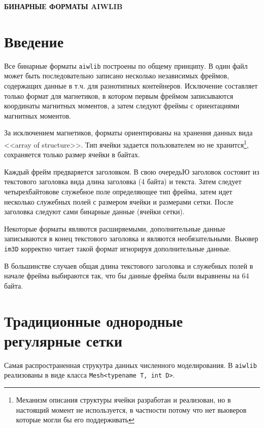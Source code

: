 \documentclass[12pt]{article}
\begin{document}
\begin{center}
  \Large\bf БИНАРНЫЕ ФОРМАТЫ AIWLIB
\end{center}
\tableofcontents

\section{Введение}
Все бинарные форматы \verb'aiwlib' построены по общему принципу. В один файл может быть последовательно записано несколько независимых фреймов,
содержащих данные в т.ч. для разнотипных контейнеров. Исключение составляет только формат для магнетиков, в котором первым фреймом
записываются координаты магнитных моментов, а затем следуют фреймы с ориентациями магнитных моментов.

За исключением магнетиков, форматы ориентированы на хранения данных вида <<array of structure>>. Тип ячейки задается пользователем но не хранится\footnote{Механизм описания структуры ячейки разработан и реализован, но в настоящий момент не используется, в частности потому что нет вьюверов которые могли бы его поддерживать},
сохраняется только размер ячейки в байтах.

Каждый фрейм предваряется заголовком.
В свою очередьЮ заголовок состояит из текстового заголовка вида длина заголовка (4 байта) и текста.
Затем следует четырехбайтовове служебное поле определяющее тип фрейма,
затем идет несколько служебных полей с размером ячейки и размерами сетки. После заголовка следуют сами бинарные данные (ячейки сетки). 

Некоторые форматы являются расширяемыми, дополнительные данные записываются в конец текстового заголовка и являются необязательными. Вьювер \verb'im3D' корректно читает
такой формат игнорируя дополнительные данные.

В большинстве случаев общая длина текстового заголовка и служебных полей в начале фрейма выбираются так, что бы данные фрейма были выравнены на 64 байта.

\section{Традиционные однородные регулярные сетки}
Самая распространенная струкутра данных численного моделирования.
В \verb'aiwlib' реализованы в виде класса \verb'Mesh<typename T, int D>'. 
\end{document}
